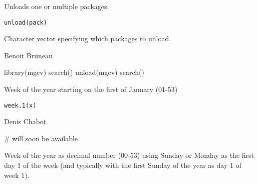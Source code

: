 \documentclass[a4paper]{book}
\begin{document}
%
\begin{Description}\relax
Unloads one or multiple packages.
\end{Description}
%
\begin{Usage}
\begin{verbatim}
unload(pack)
\end{verbatim}
\end{Usage}
%
\begin{Arguments}
\begin{ldescription}
\item[\code{pack}] Character vector specifying which packages to unload.

\end{ldescription}
\end{Arguments}
%
\begin{Author}\relax
Benoit Bruneau
\end{Author}
%
\begin{Examples}
\begin{ExampleCode}
library(mgcv)
search()
unload(mgcv)
search()
\end{ExampleCode}
\end{Examples}
\newpage
{}
%
\begin{Description}\relax
 Week of the year starting on the first of January (01-53)
\end{Description}
%
\begin{Usage}
\begin{verbatim}
week.1(x)
\end{verbatim}
\end{Usage}
%
\begin{Arguments}
\begin{ldescription}
\item[\code{x}] 


\end{ldescription}
\end{Arguments}
%
\begin{Author}\relax
Denis Chabot
\end{Author}
%
\begin{Examples}
\begin{ExampleCode}
# will soon be available
\end{ExampleCode}
\end{Examples}
\newpage
{}
%
\begin{Description}\relax
Week of the year as decimal number (00-53) using Sunday or Monday as 
the first day 1 of the week (and typically with the first Sunday of the year as day 1 of week 1).
\end{Description}
\end{document}
